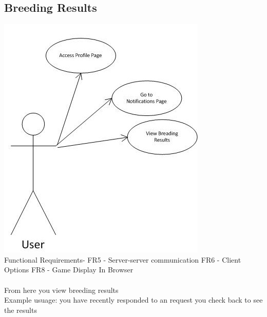 \documentclass{project}
\begin{document}
\subsection{Breeding Results}
\includegraphics[scale=0.6]{BreedingResultsPageUseCase.jpg}
\\
Functional Requirements-
FR5 - Server-server communication
FR6 - Client Options
FR8 - Game Display In Browser
\\
\\
From here you view breeding results
\\
Example usuage: you have recently responded to an request you check back to see the results

\newpage
\end{document}
